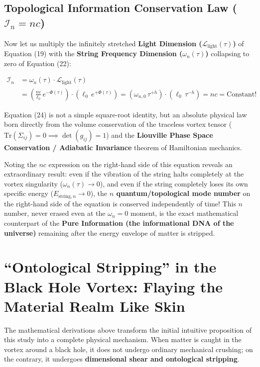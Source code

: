 \documentclass[12pt,a4paper]{article}
\begin{document}
\subsection{Topological Information Conservation Law ($\mathcal{I}_n = n c$)}

Now let us multiply the infinitely stretched \textbf{Light Dimension ($\mathcal{L}_{\text{light}}(\tau)$)} of Equation (19) with the \textbf{String Frequency Dimension ($\omega_n(\tau)$)} collapsing to zero of Equation (22):

\begin{equation}
\begin{split}
\mathcal{I}_n &= \omega_n(\tau) \cdot \mathcal{L}_{\text{light}}(\tau) \\
&= \left( \frac{n c}{\ell_0} \, e^{-\Phi(\tau)} \right) \cdot \left( \ell_0 \, e^{+\Phi(\tau)} \right) = \left( \omega_{n,0} \, \tau^{+h} \right) \cdot \left( \ell_0 \, \tau^{-h} \right) = n c = \text{Constant!}
\end{split}
\end{equation}

Equation (24) is not a simple square-root identity, but an absolute physical law born directly from the volume conservation of the traceless vortex tensor ($\text{Tr}(\Sigma_{ij}) = 0 \implies \det(g_{ij}) = 1$) and the \textbf{Liouville Phase Space Conservation / Adiabatic Invariance} theorem of Hamiltonian mechanics.

Noting the $n c$ expression on the right-hand side of this equation reveals an extraordinary result: even if the vibration of the string halts completely at the vortex singularity ($\omega_n(\tau) \to 0$), and even if the string completely loses its own specific energy ($E_{\text{string}, n} \to 0$), the \textbf{$n$ quantum/topological mode number} on the right-hand side of the equation is conserved independently of time! This $n$ number, never erased even at the $\omega_n = 0$ moment, is the exact mathematical counterpart of the \textbf{Pure Information (the informational DNA of the universe)} remaining after the energy envelope of matter is stripped.

\section{``Ontological Stripping'' in the Black Hole Vortex: Flaying the Material Realm Like Skin}

The mathematical derivations above transform the initial intuitive proposition of this study into a complete physical mechanism. When matter is caught in the vortex around a black hole, it does not undergo ordinary mechanical crushing; on the contrary, it undergoes \textbf{dimensional shear and ontological stripping}.
\end{document}
